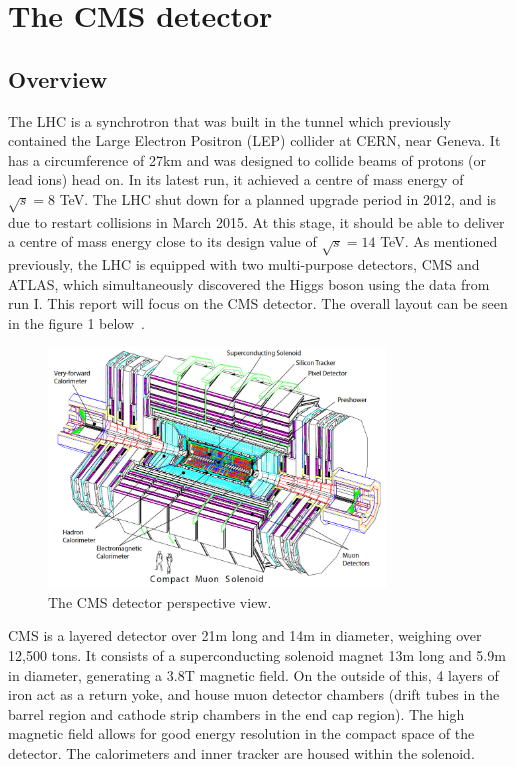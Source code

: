 \documentclass[10pt]{article}
\begin{document}
\newpage

\section{The CMS detector}

\subsection{Overview}
The LHC is a synchrotron that was built in the tunnel which previously contained the Large Electron Positron (LEP) collider at CERN, near Geneva. It has a circumference of 27km and was designed to collide beams of protons (or lead ions) head on. In its latest run, it achieved a centre of mass energy of $\sqrt{s}=8$ TeV. The LHC shut down for a planned upgrade period in 2012, and is due to restart collisions in March 2015. At this stage, it should be able to deliver a centre of mass energy close to its design value of $\sqrt{s}=14$ TeV. 
As mentioned previously, the LHC is equipped with two multi-purpose detectors, CMS and ATLAS, which simultaneously discovered the Higgs boson using the data from run I. This report will focus on the CMS detector. The overall layout can be seen in the figure 1 below~\cite{CMSTDR}.
\begin{figure}[h]

  \centering
  \includegraphics[width=0.8\textwidth]{"CMSExploded"}
  \caption{The CMS detector perspective view.}
\end{figure}
CMS is a layered detector over 21m long and 14m in diameter, weighing over 12,500 tons. It consists of a superconducting solenoid magnet 13m long and 5.9m in diameter, generating a 3.8T magnetic field. On the outside of this, 4 layers of iron act as a return yoke, and house muon detector chambers (drift tubes in the barrel region and cathode strip chambers in the end cap region). The high magnetic field allows for good energy resolution in the compact space of the detector. The calorimeters and inner tracker are housed within the solenoid. 
\end{document}
